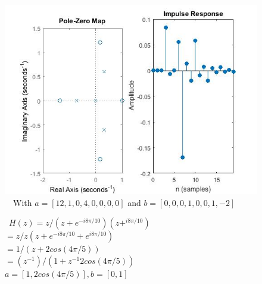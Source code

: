 \documentclass{article}
\begin{document}
\begin{figure}[H]
\includegraphics[scale = .5]{report5_3} \
\ With $a = [12,1,0,4,0,0,0,0]$ and $b =[0,0,0,1,0,0,1,-2]$
\end{figure}

\begin{figure}[H]
\ $H(z) = z/{(z+e^{-i8\pi/10})(z+^{i8\pi/10})}$
\\ $ = z/{z(z + e^{-i8\pi/10} + e^{i8\pi/10})}$
\\ $ = 1/(z+2cos(4\pi/5))$
\\ $ = (z^{-1})/(1 + z^{-1}2cos(4\pi/5))$
\\ $ a = [1,2cos(4\pi/5)], b = [0,1]$
\end{figure}



\break
\end{document}
